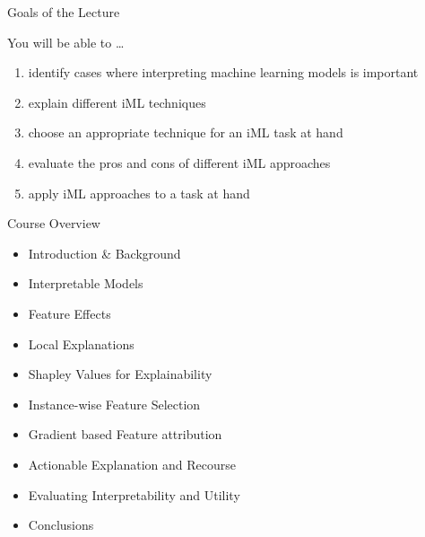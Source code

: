 \documentclass[aspectratio=169]{../latex_main/tntbeamer}  %
\begin{document}
\begin{frame}[c]{Goals of the Lecture}

You will be able to \ldots
\begin{enumerate}
  \item \alert{identify} cases where interpreting machine learning models is important
  \item \alert{explain} different iML techniques
  \item \alert{choose} an appropriate technique for an iML task at hand
  \item \alert{evaluate} the pros and cons of different iML approaches
  \item \alert{apply} iML approaches to a task at hand
\end{enumerate}

\end{frame}
\begin{frame}[c]{Course Overview}

\begin{itemize}
	\item Introduction \& Background 
	\item Interpretable Models 
	\item Feature Effects
	\item Local Explanations
	\item Shapley Values for Explainability
	\item Instance-wise Feature Selection
	\item Gradient based Feature attribution
	\item Actionable Explanation and Recourse
	\item Evaluating Interpretability and Utility
	\item Conclusions 
\end{itemize}


\end{frame}
\end{document}
